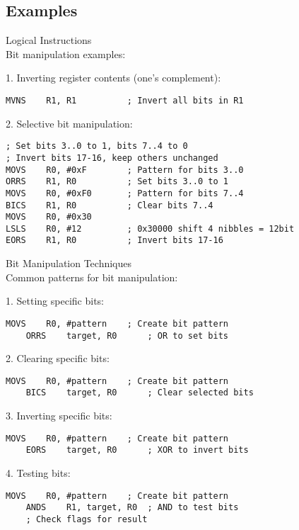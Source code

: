 \subsection{Examples}

\begin{example2}{Logical Instructions}\\
Bit manipulation examples:

1. Inverting register contents (one's complement):
\begin{lstlisting}[language=armasm, style=basesmol]
MVNS    R1, R1          ; Invert all bits in R1
\end{lstlisting}

2. Selective bit manipulation:
\begin{lstlisting}[language=armasm, style=basesmol]
; Set bits 3..0 to 1, bits 7..4 to 0
; Invert bits 17-16, keep others unchanged
MOVS    R0, #0xF        ; Pattern for bits 3..0
ORRS    R1, R0          ; Set bits 3..0 to 1
MOVS    R0, #0xF0       ; Pattern for bits 7..4
BICS    R1, R0          ; Clear bits 7..4
MOVS    R0, #0x30       
LSLS    R0, #12         ; 0x30000 shift 4 nibbles = 12bit
EORS    R1, R0          ; Invert bits 17-16
\end{lstlisting}
\end{example2}

\begin{KR}{Bit Manipulation Techniques}\\
Common patterns for bit manipulation:

1. Setting specific bits:
\begin{lstlisting}[language=armasm, style=basesmol]
    MOVS    R0, #pattern    ; Create bit pattern
    ORRS    target, R0      ; OR to set bits
\end{lstlisting}

2. Clearing specific bits:
\begin{lstlisting}[language=armasm, style=basesmol]
    MOVS    R0, #pattern    ; Create bit pattern
    BICS    target, R0      ; Clear selected bits
\end{lstlisting}

3. Inverting specific bits:
\begin{lstlisting}[language=armasm, style=basesmol]
    MOVS    R0, #pattern    ; Create bit pattern
    EORS    target, R0      ; XOR to invert bits
\end{lstlisting}

4. Testing bits:
\begin{lstlisting}[language=armasm, style=basesmol]
    MOVS    R0, #pattern    ; Create bit pattern
    ANDS    R1, target, R0  ; AND to test bits
    ; Check flags for result
\end{lstlisting}
\end{KR}

